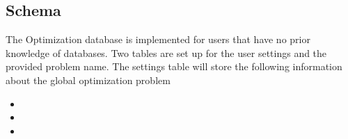 \subsection{Schema}

The Optimization database is implemented for users that have no prior knowledge of databases. Two tables are set up for the user settings and the provided problem name. The settings table will store the following information about the global optimization problem
\begin{itemize}
    \item  
    \item
    \item 
\end{itemize}
